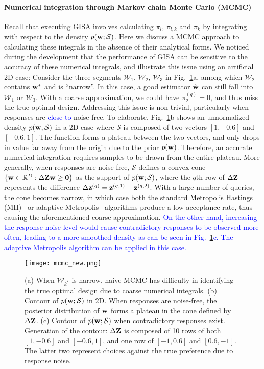 \documentclass[onecolumn,11pt]{article}
\newcommand{\highlight}[1]{{\textcolor{blue}{{#1}}}}
\newcommand{\highlight}[1]{{{#1}}}
\begin{document}
\paragraph{Numerical integration through Markov chain Monte Carlo (MCMC)} Recall that executing GISA involves calculating $\pi_{l}$, $\pi_{l,k}$ and $\pi_k$ by integrating with respect to the density $p({\bf w};\mathcal{S})$. Here we discuss a MCMC approach to calculating these integrals in the absence of their analytical forms. We noticed during the development that the performance of GISA can be sensitive to the accuracy of these numerical integrals, 
and illustrate this issue using an artificial 2D case: Consider the three segments $\mathcal{W}_{1}$, $\mathcal{W}_{2}$, $\mathcal{W}_{3}$ in Fig.~\ref{fig:mcmc}a, among which $\mathcal{W}_2$ contains ${\bf w}^*$ and is ``narrow''. In this case, a good estimator $\hat{\bf w}$ can still fall into $\mathcal{W}_1$ or $\mathcal{W}_3$. With a coarse approximation, we could have $\pi_{2}^{(q)}=0$, and thus miss the true optimal design. Addressing this issue is non-trivial, particularly when responses are \highlight{close to} noise-free. To elaborate, Fig.~\ref{fig:mcmc}b shows an unnormalized density $p({\bf w};\mathcal{S})$ in a 2D case where $\mathcal{S}$ is composed of two vectors $[1,-0.6]$ and $[-0.6,1]$. The function forms a plateau between the two vectors, and only drops in value far away from the origin due to the prior $p({\bf w})$. Therefore, an accurate numerical integration requires samples to be drawn from the entire plateau. More generally, when responses are noise-free, $\mathcal{S}$ defines a convex cone $\{{\bf w}\in \mathbb{R}^D:\Delta {\bf Z}{\bf w}\geq {\bf 0}\}$ as the support of $p({\bf w};\mathcal{S})$, where the $q$th row of $\Delta {\bf Z}$ represents the difference $\Delta {\bf z}^{(q)} = {\bf z}^{(q,1)}-{\bf z}^{(q,2)}$. With a large number of queries, the cone becomes narrow, in which case both the standard Metropolis Hastings (MH)~\cite{chib1995understanding} or adaptive Metropolis~\cite{haario2001adaptive} algorithms produce a low acceptance rate, thus causing the aforementioned coarse approximation. \highlight{On the other hand, increasing the response noise level would cause contradictory responses to be observed more often, leading to a more smoothed density as can be seen in Fig.~\ref{fig:mcmc}c. The adaptive Metropolis algorithm can be applied in this case.}
\begin{figure}
\centering
\texttt{[image: mcmc\_new.png]}
\caption{(a) When $\mathcal{W}_{k^*}$ is narrow, naive MCMC has difficulty in identifying the true optimal design due to coarse numerical integrals. (b) Contour of $p({\bf w};\mathcal{S})$ in 2D. When responses are noise-free, the posterior distribution of ${\bf w}$ forms a plateau in the cone defined by $\Delta {\bf Z}$. (c) Contour of $p({\bf w};\mathcal{S})$ when contradictory responses exist. Generation of the contour: $\Delta {\bf Z}$ is composed of 10 rows of both $[1,-0.6]$ and $[-0.6,1]$, and one row of $[-1,0.6]$ and $[0.6,-1]$. The latter two represent choices against the true preference due to response noise.}
\label{fig:mcmc}
\end{figure}
\end{document}
